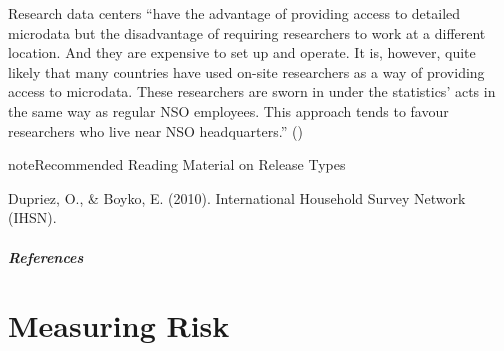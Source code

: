 \documentclass[letterpaper,10pt,english]{sphinxmanual}
\begin{document}
Research data centers “have the advantage of providing access to
detailed microdata but the disadvantage of requiring researchers to work
at a different location. And they are expensive to set up and operate.
It is, however, quite likely that many countries have used on-site
researchers as a way of providing access to microdata. These researchers
are sworn in under the statistics’ acts in the same way as regular NSO
employees. This approach tends to favour researchers who live near NSO
headquarters.” ({\hyperref[\detokenize{release_types:dubo10}]{}})

\begin{sphinxadmonition}{note}{Recommended Reading Material on Release Types}

Dupriez, O., \& Boyko, E. (2010).  International Household Survey
Network (IHSN).
\end{sphinxadmonition}
\paragraph{References}


\chapter{Measuring Risk}
\label{\detokenize{measure_risk:measuring-risk}}\label{\detokenize{measure_risk::doc}}
\end{document}
